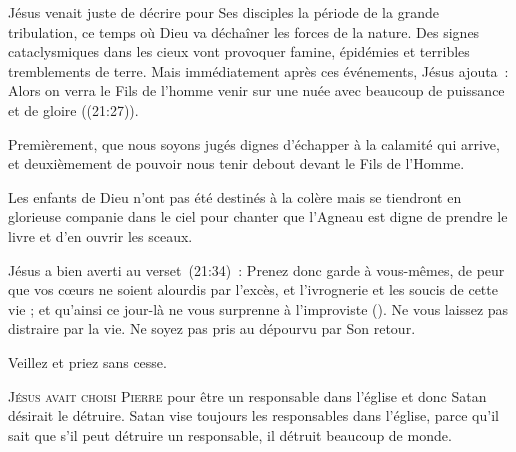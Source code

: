 Jésus venait juste de décrire pour Ses disciples la période
 de la grande tribulation, ce temps où Dieu va déchaîner les forces
 de la nature. Des signes cataclysmiques dans les cieux vont provoquer famine,
 épidémies et terribles tremblements de terre.
 Mais immédiatement après ces événements, Jésus ajouta~: 
 \og Alors on verra le Fils de l'homme venir sur une nuée avec beaucoup
 de puissance et de gloire \fg{} ((21:27)).


Premièrement, que nous soyons jugés dignes d'échapper à la calamité
 qui arrive, et deuxièmement de pouvoir nous tenir debout
 devant le Fils de l'Homme.

Les enfants de Dieu n'ont pas été destinés à la colère mais se tiendront
 en glorieuse companie dans le ciel pour chanter que l'Agneau
 est digne de prendre le livre et d'en ouvrir les sceaux.

Jésus a bien averti au verset~(21:34)~: 
 \og Prenez donc garde à vous-mêmes, de peur que vos cœurs ne soient
 alourdis par l’excès, et l’ivrognerie et les soucis de cette vie ;
 et qu'ainsi ce jour-là ne vous surprenne à l’improviste \fg{} (\KJF).
 Ne vous laissez pas distraire par la vie.
 Ne soyez pas pris au dépourvu par Son retour.

Veillez et priez \ocadr sans cesse.

\dvrule






\lettrine{J}{ésus avait choisi Pierre} pour être un responsable
 dans l'église 
 et donc Satan désirait le détruire.
 Satan vise toujours les responsables dans l'église, 
 parce qu'il sait que s'il peut détruire un responsable,
 il détruit beaucoup de monde.

